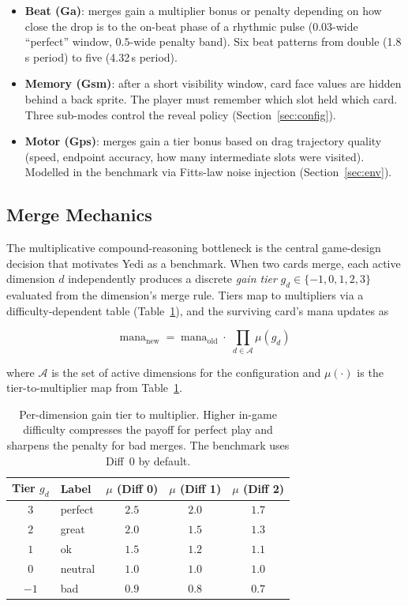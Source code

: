 \documentclass[11pt]{article}
\begin{document}
\begin{itemize}
  \item \textbf{Beat (Ga)}: merges gain a multiplier bonus or penalty
    depending on how close the drop is to the on-beat phase of a
    rhythmic pulse ($0.03$-wide ``perfect'' window, $0.5$-wide penalty
    band). Six beat patterns from double (1.8\,s period) to five
    (4.32\,s period).
  \item \textbf{Memory (Gsm)}: after a short visibility window, card face
    values are hidden behind a back sprite. The player must remember
    which slot held which card. Three sub-modes control the reveal
    policy (Section~\ref{sec:config}).
  \item \textbf{Motor (Gps)}: merges gain a tier bonus based on drag
    trajectory quality (speed, endpoint accuracy, how many intermediate
    slots were visited). Modelled in the benchmark via Fitts-law
    noise injection (Section~\ref{sec:env}).
\end{itemize}

\subsection{Merge Mechanics}
\label{sec:merge}

The multiplicative compound-reasoning bottleneck is the central game-design
decision that motivates Yedi as a benchmark. When two cards merge, each
active dimension $d$ independently produces a discrete \emph{gain tier}
$g_d \in \{-1, 0, 1, 2, 3\}$ evaluated from the dimension's merge rule.
Tiers map to multipliers via a difficulty-dependent table
(Table~\ref{tab:tiers}), and the surviving card's mana updates as

\begin{equation}
\label{eq:merge}
\text{mana}_{\text{new}} \;=\; \text{mana}_{\text{old}} \;\cdot\; \prod_{d \in \mathcal{A}} \mu(g_d)
\end{equation}

where $\mathcal{A}$ is the set of active dimensions for the configuration
and $\mu(\cdot)$ is the tier-to-multiplier map from Table~\ref{tab:tiers}.

\begin{table}[h]
\centering
\small
\begin{tabular}{@{}clccc@{}}
\toprule
\textbf{Tier $g_d$} & \textbf{Label} & $\mu$ (Diff 0) & $\mu$ (Diff 1) & $\mu$ (Diff 2) \\
\midrule
$3$  & perfect  & $2.5$ & $2.0$ & $1.7$ \\
$2$  & great    & $2.0$ & $1.5$ & $1.3$ \\
$1$  & ok       & $1.5$ & $1.2$ & $1.1$ \\
$0$  & neutral  & $1.0$ & $1.0$ & $1.0$ \\
$-1$ & bad      & $0.9$ & $0.8$ & $0.7$ \\
\bottomrule
\end{tabular}
\caption{Per-dimension gain tier to multiplier. Higher in-game difficulty
compresses the payoff for perfect play and sharpens the penalty for bad
merges. The benchmark uses Diff~0 by default.}
\label{tab:tiers}
\end{table}
\end{document}
